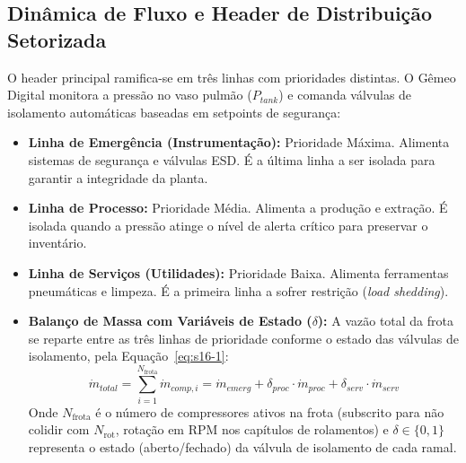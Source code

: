 \documentclass[12pt,a4paper]{article}
\numberwithin{equation}{section}
\numberwithin{table}{section}
\numberwithin{figure}{section}
\begin{document}
{\subsection{Dinâmica de Fluxo e Header de Distribuição Setorizada}

O header principal ramifica-se em três linhas com prioridades distintas. O Gêmeo Digital monitora a pressão no vaso pulmão ($P_{tank}$) e comanda válvulas de isolamento automáticas baseadas em setpoints de segurança:

\begin{itemize}
	\item \textbf{Linha de Emergência (Instrumentação):} Prioridade Máxima. Alimenta sistemas de segurança e válvulas ESD. É a última linha a ser isolada para garantir a integridade da planta.
	\item \textbf{Linha de Processo:} Prioridade Média. Alimenta a produção e extração. É isolada quando a pressão atinge o nível de alerta crítico para preservar o inventário.
	\item \textbf{Linha de Serviços (Utilidades):} Prioridade Baixa. Alimenta ferramentas pneumáticas e limpeza. É a primeira linha a sofrer restrição (\textit{load shedding}).
	\item \textbf{Balanço de Massa com Variáveis de Estado ($\delta$):} A vazão total da frota se reparte entre as três linhas de prioridade conforme o estado das válvulas de isolamento, pela Equação~\eqref{eq:s16-1}:
	\begin{equation}\label{eq:s16-1}
\dot{m}_{total} = \sum_{i=1}^{N_{\text{frota}}} \dot{m}_{comp,i} = \dot{m}_{emerg} + \delta_{proc} \cdotp \dot{m}_{proc} + \delta_{serv} \cdotp \dot{m}_{serv}
\end{equation}
	Onde $N_{\text{frota}}$ é o número de compressores ativos na frota (subscrito para não colidir com $N_{\text{rot}}$, rotação em RPM nos capítulos de rolamentos) e $\delta \in \{0, 1\}$ representa o estado (aberto/fechado) da válvula de isolamento de cada ramal.
\end{itemize}

}
\end{document}
